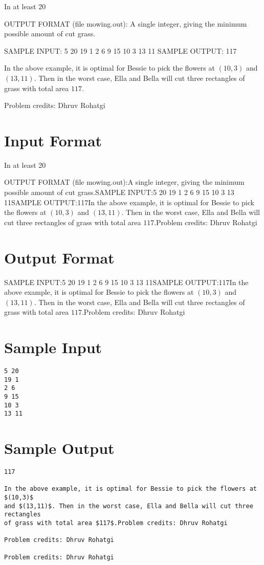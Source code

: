 \documentclass[12pt]{article}
\begin{document}
In at least 20%

OUTPUT FORMAT (file mowing.out):
A single integer, giving the minimum possible amount of cut grass.

SAMPLE INPUT:
5 20
19 1
2 6
9 15
10 3
13 11
SAMPLE OUTPUT: 
117

In the above example, it is optimal for Bessie to pick the flowers at $(10,3)$
and $(13,11)$. Then in the worst case, Ella and Bella will cut three rectangles
of grass with total area $117$.


Problem credits: Dhruv Rohatgi



\section*{Input Format}
In at least 20%

OUTPUT FORMAT (file mowing.out):A single integer, giving the minimum possible amount of cut grass.SAMPLE INPUT:5 20
19 1
2 6
9 15
10 3
13 11SAMPLE OUTPUT:117In the above example, it is optimal for Bessie to pick the flowers at $(10,3)$
and $(13,11)$. Then in the worst case, Ella and Bella will cut three rectangles
of grass with total area $117$.Problem credits: Dhruv Rohatgi

\section*{Output Format}
SAMPLE INPUT:5 20
19 1
2 6
9 15
10 3
13 11SAMPLE OUTPUT:117In the above example, it is optimal for Bessie to pick the flowers at $(10,3)$
and $(13,11)$. Then in the worst case, Ella and Bella will cut three rectangles
of grass with total area $117$.Problem credits: Dhruv Rohatgi

\section*{Sample Input}
\begin{verbatim}
5 20
19 1
2 6
9 15
10 3
13 11
\end{verbatim}

\section*{Sample Output}
\begin{verbatim}
117

In the above example, it is optimal for Bessie to pick the flowers at $(10,3)$
and $(13,11)$. Then in the worst case, Ella and Bella will cut three rectangles
of grass with total area $117$.Problem credits: Dhruv Rohatgi

Problem credits: Dhruv Rohatgi

Problem credits: Dhruv Rohatgi
\end{verbatim}
\end{document}
